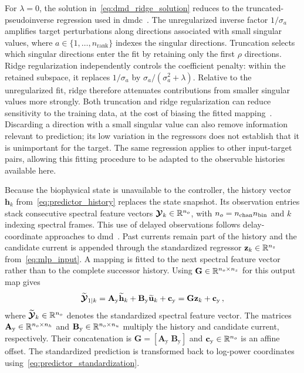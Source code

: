 For $\lambda=0$, the solution in~\eqref{eq:dmd_ridge_solution} reduces to the truncated-pseudoinverse regression used in \ac{dmdc}~\cite{Proctor2016}.
The unregularized inverse factor $1/\sigma_a$ amplifies target perturbations along directions associated with small singular values, where $a\in\{1,\ldots,n_{\mathrm{rank}}\}$ indexes the singular directions.
Truncation selects which singular directions enter the fit by retaining only the first $\rho$ directions.
Ridge regularization independently controls the coefficient penalty: within the retained subspace, it replaces $1/\sigma_a$ by $\sigma_a/(\sigma_a^2+\lambda)$.
Relative to the unregularized fit, ridge therefore attenuates contributions from smaller singular values more strongly.
Both truncation and ridge regularization can reduce sensitivity to the training data, at the cost of biasing the fitted mapping~\cite{Boyd2004}.
Discarding a direction with a small singular value can also remove information relevant to prediction; its low variation in the regressors does not establish that it is unimportant for the target.
The same regression applies to other input-target pairs, allowing this fitting procedure to be adapted to the observable histories available here.

Because the biophysical state is unavailable to the controller, the history vector $\mathbf{h}_k$ from~\eqref{eq:predictor_history} replaces the state snapshot.
Its observation entries stack consecutive spectral feature vectors $\boldsymbol{\mathcal{Y}}{}_k\in\mathbb{R}^{n_{o}}$, with $n_{o}=n_{\mathrm{chan}}{} n_{\mathrm{bin}}{}$ and $k$ indexing spectral frames.
This use of delayed observations follows delay-coordinate approaches to \ac{dmd}~\cite{Arbabi2017}.
Past currents remain part of the history and the candidate current is appended through the standardized regressor $\mathbf{z}_k\in\mathbb{R}^{n_{z}}$ from~\eqref{eq:mlp_input}.
A mapping is fitted to the next spectral feature vector rather than to the complete successor history.
Using $\mathbf{G}\in\mathbb{R}^{n_{o}\times n_{z}}$ for this output map gives
\begin{equation}
    \widetilde{\boldsymbol{\mathcal{Y}}{}}_{1|k}
    =\mathbf{A}_\mathrm{y}\widetilde{\mathbf{h}}_k
    +\mathbf{B}_\mathrm{y}\widetilde{\mathbf{u}}_k
    +\mathbf{c}_\mathrm{y}
    =\mathbf{G}\mathbf{z}_k+\mathbf{c}_\mathrm{y}\,,
    \label{eq:dmd_affine_predictor}
\end{equation}
where $\widetilde{\boldsymbol{\mathcal{Y}}{}}_k\in\mathbb{R}^{n_{o}}$ denotes the standardized spectral feature vector.
The matrices $\mathbf{A}_\mathrm{y}\in\mathbb{R}^{n_{o}\times n_{h}}$ and $\mathbf{B}_\mathrm{y}\in\mathbb{R}^{n_{o}\times n_{u}}$ multiply the history and candidate current, respectively.
Their concatenation is $\mathbf{G}=[\mathbf{A}_\mathrm{y}\;\mathbf{B}_\mathrm{y}]$ and $\mathbf{c}_\mathrm{y}\in\mathbb{R}^{n_{o}}$ is an affine offset.
The standardized prediction is transformed back to log-power coordinates using~\eqref{eq:predictor_standardization}.

